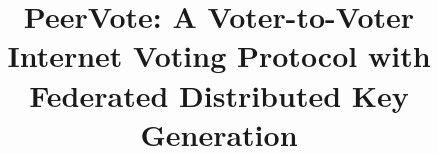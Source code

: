 \documentclass[runningheads]{llncs}
\begin{document}
\title{PeerVote: A Voter-to-Voter Internet Voting Protocol with Federated Distributed Key Generation}
%
%




\maketitle

\end{document}
